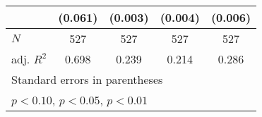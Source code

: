 {\begin{tabular}{l*{4}{c}}
            &     (0.061)         &     (0.003)         &     (0.004)         &     (0.006)         \\
\hline
\(N\)       &         527         &         527         &         527         &         527         \\
adj. \(R^{2}\)&       0.698         &       0.239         &       0.214         &       0.286         \\
\hline\hline
\multicolumn{5}{l}{\footnotesize Standard errors in parentheses}\\
\multicolumn{5}{l}{\footnotesize \sym{*} \(p<0.10\), \sym{**} \(p<0.05\), \sym{***} \(p<0.01\)}\\
\end{tabular}
}
